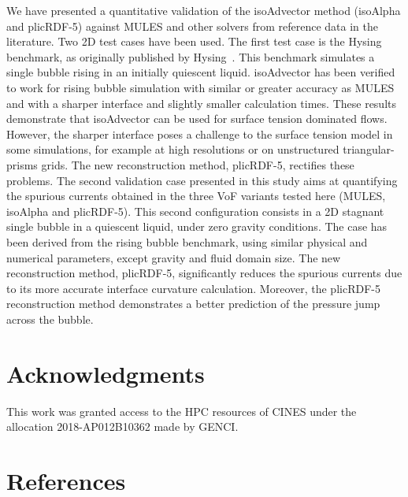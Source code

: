 \documentclass[review]{elsarticle}
\begin{document}
We have presented a quantitative validation of the isoAdvector method (isoAlpha and plicRDF-5) against MULES and other solvers from reference data in the literature. Two 2D test cases have been used. The first test case is the Hysing benchmark, as originally published by Hysing~\cite{Hysing2009}. This benchmark simulates a single bubble rising in an initially quiescent liquid. isoAdvector has been verified to work for rising bubble simulation with similar or greater accuracy as MULES and with a sharper interface and slightly smaller calculation times. These results demonstrate that isoAdvector can be used for surface tension dominated flows. However, the sharper interface poses a challenge to the surface tension model in some simulations, for example at high resolutions or on unstructured triangular-prisms grids. The new reconstruction method, plicRDF-5, rectifies these problems. The second validation case presented in this study aims at quantifying the spurious currents obtained in the three VoF variants tested here (MULES, isoAlpha and plicRDF-5). This second configuration consists in a 2D stagnant single bubble in a quiescent liquid, under zero gravity conditions. The case has been derived from the rising bubble benchmark, using similar physical and numerical parameters, except gravity and fluid domain size. The new reconstruction method, plicRDF-5, significantly reduces the spurious currents due to its more accurate interface curvature calculation. Moreover, the plicRDF-5 reconstruction method demonstrates a better prediction of the pressure jump across the bubble. 


\section*{Acknowledgments}
\noindent
This  work  was  granted  access  to  the  HPC  resources  of CINES under the 
allocation 2018-AP012B10362 made by GENCI.

\clearpage
\section*{References}


\end{document}
